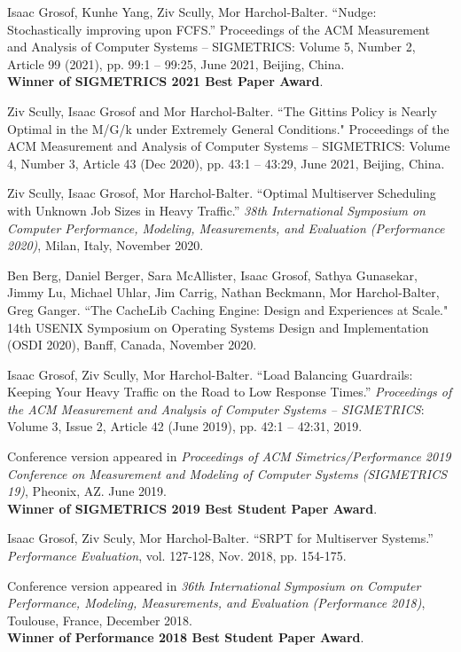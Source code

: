 \documentclass{res}
\begin{document}
\begin{resume}
    Isaac Grosof, Kunhe Yang, Ziv Scully, Mor Harchol-Balter.
    ``Nudge: Stochastically improving upon FCFS.''
    Proceedings of the ACM Measurement and Analysis of Computer Systems -- SIGMETRICS: Volume 5, Number 2, Article 99 (2021), pp. 99:1 -- 99:25, June 2021, Beijing, China.\\
    \textbf{Winner of SIGMETRICS 2021 Best Paper Award}.

    Ziv Scully, Isaac Grosof and Mor Harchol-Balter.
    ``The Gittins Policy is Nearly Optimal in the M/G/k under Extremely General Conditions."
    Proceedings of the ACM Measurement and Analysis of Computer Systems -- SIGMETRICS: Volume 4, Number 3, Article 43 (Dec 2020), pp. 43:1 -- 43:29, June 2021, Beijing, China.

    Ziv Scully, Isaac Grosof, Mor Harchol-Balter.
    ``Optimal Multiserver Scheduling with Unknown Job Sizes in Heavy Traffic.''
    \textit{38th International Symposium on Computer Performance, Modeling, Measurements, and Evaluation (Performance 2020)},
    Milan, Italy, November 2020.

	Ben Berg, Daniel Berger, Sara McAllister, Isaac Grosof, Sathya Gunasekar, Jimmy Lu, Michael Uhlar,
	Jim Carrig, Nathan Beckmann, Mor Harchol-Balter, Greg Ganger.
	``The CacheLib Caching Engine: Design and Experiences at Scale."
	14th USENIX Symposium on Operating Systems Design and Implementation (OSDI 2020),
	Banff, Canada, November 2020.

    Isaac Grosof, Ziv Scully, Mor Harchol-Balter.
    ``Load Balancing Guardrails: Keeping Your Heavy Traffic on the Road to Low Response Times.''
    \textit{Proceedings of the ACM Measurement and Analysis of Computer Systems -- SIGMETRICS}:
    Volume 3, Issue 2, Article 42 (June 2019), pp. 42:1 -- 42:31, 2019.

    Conference version appeared in \textit{Proceedings of ACM Simetrics/Performance 2019
    Conference on Measurement and Modeling of Computer Systems (SIGMETRICS 19)}, Pheonix, AZ.
    June 2019.\\
    \textbf{Winner of SIGMETRICS 2019 Best Student Paper Award}.

    Isaac Grosof, Ziv Sculy, Mor Harchol-Balter.
    ``SRPT for Multiserver Systems.''
    \textit{Performance Evaluation}, vol. 127-128, Nov. 2018, pp. 154-175.

    Conference version appeared in \textit{36th International Symposium on Computer Performance, Modeling, Measurements, and Evaluation (Performance 2018)}, Toulouse, France, December 2018. \\
    \textbf{Winner of Performance 2018 Best Student Paper Award}.


\end{resume}
\end{document}
